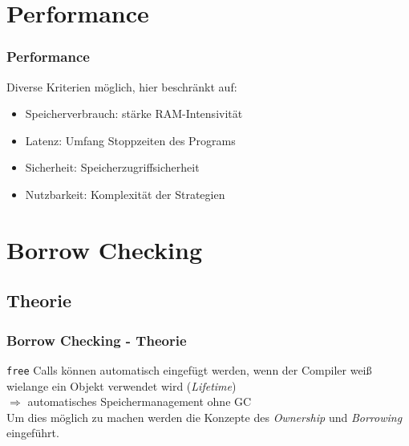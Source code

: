\documentclass{beamer}
\begin{document}
    \section{Performance}
        \begin{frame}
            \frametitle{Performance}

            Diverse Kriterien möglich, hier beschränkt auf:

            \begin{itemize}
                \item Speicherverbrauch: stärke RAM-Intensivität
                \item Latenz: Umfang Stoppzeiten des Programs
                \item Sicherheit: Speicherzugriffsicherheit
                \item Nutzbarkeit: Komplexität der Strategien
            \end{itemize}
        \end{frame}
        
    \section{Borrow Checking}

        \subsection{Theorie}
        \begin{frame}
            \frametitle{Borrow Checking - Theorie}

            \texttt{free} Calls können automatisch eingefügt werden, wenn der Compiler weiß wielange ein Objekt verwendet wird (\textit{Lifetime})\\
            $\Rightarrow$ automatisches Speichermanagement ohne GC\\
            Um dies möglich zu machen werden die Konzepte des \textit{Ownership} und \textit{Borrowing} eingeführt.
        \end{frame}
\end{document}
